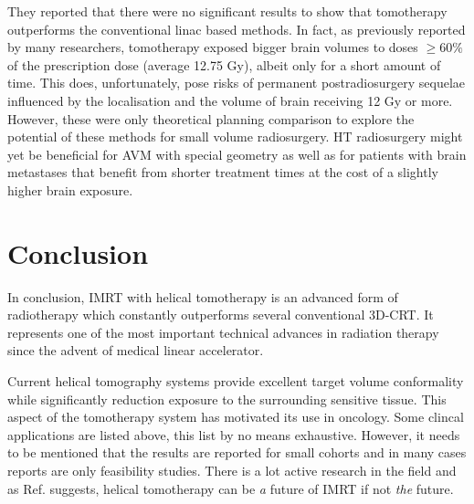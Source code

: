 \documentclass[10pt,journal,compsoc]{IEEEtran} %
\begin{document}
  They 
  reported that there were no significant results to show that tomotherapy 
  outperforms the conventional linac based methods. In fact, as previously 
  reported by many researchers, tomotherapy exposed bigger brain volumes 
  to doses $\ge60\%$ of the prescription dose (average 12.75 Gy), albeit only 
  for a short amount of time. This does, unfortunately, pose risks of 
  permanent postradiosurgery sequelae influenced by the localisation and the 
  volume of brain receiving 12 Gy or more. However, these were only theoretical 
  planning comparison to explore the potential of these methods for small 
  volume radiosurgery. HT radiosurgery might yet be beneficial for AVM with 
  special geometry as well as for patients with brain metastases that benefit 
  from shorter treatment times at the cost of a slightly higher brain exposure.
  
  \section{Conclusion}
  \label{conclusions}
  In conclusion, IMRT with helical tomotherapy is an advanced form of 
  radiotherapy which constantly outperforms several conventional 3D-CRT. It 
  represents one of the most important technical advances in radiation therapy 
  since the advent of medical linear accelerator.
  
  Current helical tomography systems provide excellent target volume 
  conformality while significantly reduction exposure to the surrounding 
  sensitive tissue. This aspect of the tomotherapy system has motivated its use 
  in oncology. Some clincal applications are listed above, this list by no 
  means exhaustive. However, it needs to be mentioned that the results are 
  reported for small cohorts and in many cases reports are only feasibility 
  studies. There is a lot active research in the field and as Ref. 
  \cite{Beavis2004} 
  suggests, helical tomotherapy can be \textit{a} future of IMRT if not 
  \textit{the} future.
  
  {}
  
  
\end{document}
